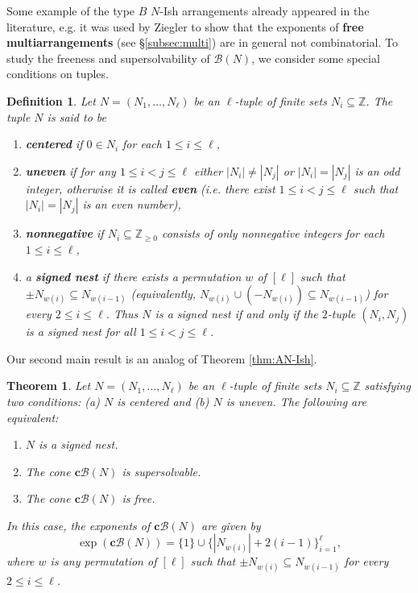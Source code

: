 \documentclass[11pt]{article}
\newtheorem{definition}[theo]{Definition}
\newtheorem{theorem}[theo]{Theorem}
\theoremstyle{definition}
\numberwithin{equation}{section}
\newcommand{\B}{\mathcal{B}}
\newcommand{\Z}{\mathbb{Z}}
\newcommand{\tbf}{\textbf}
\begin{document}
Some example of the type $B$ $N$-Ish arrangements already appeared in the literature, e.g. it was used by Ziegler \cite[Proposition 10]{Z89} to show that the exponents of \tbf{free multiarrangements} (see \S\ref{subsec:multi}) are in general not combinatorial.
To study the freeness and supersolvability of  $\B(N)$, we consider some special conditions on tuples.
\begin{definition}
\label{def:N-cond}
Let $N = (N_1, \ldots, N_\ell)$ be an $\ell$-tuple of finite sets $N_i\subseteq\Z$. The tuple $N$ is said to be
 \begin{enumerate}[(1)]
\item  \tbf{centered} if $0 \in N_i$ for each $1 \le  i \leq \ell$, 
\item  \tbf{uneven} if for any $1 \leq i < j \leq \ell$ either  $|N_i| \ne |N_j|$ or $|N_i| = |N_j|$ is an odd integer, otherwise it is  called \tbf{even} (i.e. there exist $1 \leq i < j \leq \ell$ such that $|N_i| = |N_j|$ is an even number), 
\item  \tbf{nonnegative} if $N_i \subseteq \Z_{\ge0}$ consists of only nonnegative integers  for each $1 \le  i \leq \ell$, 
\item  a \tbf{signed nest} if there exists a permutation $w$ of $[\ell]$ such that $\pm N_{w(i)} \subseteq N_{w(i-1)}$ (equivalently, $N_{w(i)} \cup (-N_{w(i)} )\subseteq N_{w(i-1)} $) for every $2 \le  i \leq \ell$. 
Thus $N$ is a signed nest if and only if the $2$-tuple $(N_i, N_j)$ is a signed nest  for all $1 \leq i < j \leq \ell$.
\end{enumerate}
\end{definition}

Our second main result is an analog of Theorem \ref{thm:AN-Ish}.

\begin{theorem}
 \label{thm:N-Ish-B-free-SS}
 Let $N = (N_1, \ldots, N_\ell)$ be  an $\ell$-tuple  of finite sets $N_i\subseteq \Z$ satisfying two conditions: (a)  $N$ is centered and (b) $N$ is uneven.
 The following are equivalent:
 \begin{enumerate}[(1)]
\item $N$ is a signed nest.
\item  The cone $\tbf{c}\B(N)$ is supersolvable.
\item The cone $\tbf{c}\B(N)$  is  free.
\end{enumerate}
In this case, the exponents of  $\tbf{c}\B(N)$ are given by 
$$\exp(\tbf{c}\B(N)) = \{1\} \cup \{| N_{w(i)}| + 2(i-1)\}_{i=1}^\ell,$$ 
where  $w$ is any permutation of $[\ell]$ such that $\pm N_{w(i)} \subseteq N_{w(i-1)}$ for every $2 \le  i \leq \ell$.
 \end{theorem}
 
\end{document}
